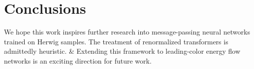 \section{Conclusions}\label{sec:conclusions}

We hope this work inspires further research into message-passing neural
networks trained on Herwig samples. The treatment of renormalized
transformers is admittedly heuristic. & Extending this framework to
leading-color energy flow networks is an exciting direction for future
work.


